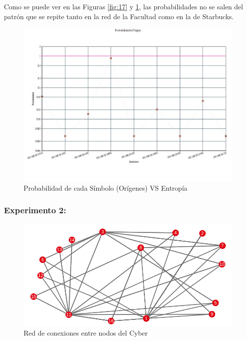 Como se puede ver en las Figuras \ref{fig:17} y \ref{fig:18}, las probabilidades no se salen del patrón que se repite tanto en la red de la Facultad como en la de Starbucks.

\begin{figure}[H]
  \centering
    \includegraphics[scale=0.45]{imagenes/graficos/Probabilidades/06origen.jpg}
  \caption{Probabilidad de cada Símbolo (Orígenes) VS Entropía }
  \label{fig:18}
\end{figure}

\subsubsection{Experimento 2:}

\begin{figure}[H]
  \centering
    \includegraphics[scale=0.75]{imagenes/graficos/grafos/cyber.png}
  \caption{Red de conexiones entre nodos del Cyber}
  \label{fig:19}
\end{figure}

